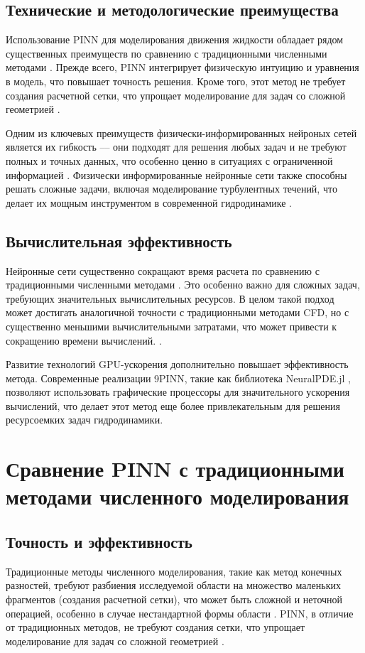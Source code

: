 \subsection{Технические и методологические преимущества}
Использование PINN для моделирования движения жидкости обладает рядом существенных преимуществ по сравнению
с традиционными численными методами \cite{cuomo2022scientific}. Прежде всего, PINN интегрирует физическую
интуицию и уравнения в модель, что повышает точность решения. Кроме того, этот метод не требует создания
расчетной сетки, что упрощает моделирование для задач со сложной геометрией \cite{cai2021physics}.

Одним из ключевых преимуществ физически-информированных нейроных сетей является их гибкость –-- они подходят для решения любых задач и
не требуют полных и точных данных, что особенно ценно в ситуациях с ограниченной
информацией \cite{karniadakis2021physics}. Физически информированные нейронные сети также способны решать
сложные задачи, включая моделирование турбулентных течений, что делает их мощным инструментом в современной
гидродинамике \cite{mao2020physics}.

\subsection{Вычислительная эффективность}
Нейронные сети существенно сокращают время расчета по сравнению с традиционными численными
методами \cite{jagtap2020conservative}. Это особенно важно для сложных задач, требующих значительных вычислительных
ресурсов. В целом такой подход может достигать аналогичной точности с традиционными методами CFD, но с существенно меньшими
вычислительными затратами, что может привести к сокращению времени вычислений. \cite{Tommaso2024pinn}.

Развитие технологий GPU-ускорения дополнительно повышает эффективность метода. Современные реализации 9PINN, такие
как библиотека NeuralPDE.jl \cite{neuralpde2023}, позволяют использовать графические процессоры для значительного
ускорения вычислений, что делает этот метод еще более привлекательным для решения ресурсоемких задач гидродинамики.

\section{Сравнение PINN с традиционными методами численного моделирования}
\subsection{Точность и эффективность}
Традиционные методы численного моделирования, такие как метод конечных разностей, требуют разбиения исследуемой области
на множество маленьких фрагментов (создания расчетной сетки), что может быть сложной и неточной операцией, особенно в
случае нестандартной формы области \cite{ferziger2019computational}. PINN, в отличие от традиционных методов, не требуют
создания сетки, что упрощает моделирование для задач со сложной геометрией \cite{karniadakis2021physics}.

